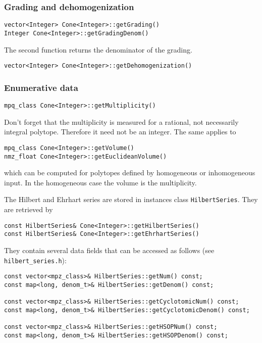 \documentclass[12pt,a4paper]{scrartcl}
\theoremstyle{definition}
\begin{document}
\begin{small}
\subsubsection{Grading and dehomogenization}

\begin{Verbatim}
vector<Integer> Cone<Integer>::getGrading()
Integer Cone<Integer>::getGradingDenom()
\end{Verbatim}
The second function returns the denominator of the grading.

\begin{Verbatim}
vector<Integer> Cone<Integer>::getDehomogenization()
\end{Verbatim}

\subsubsection{Enumerative data}

\begin{Verbatim}
mpq_class Cone<Integer>::getMultiplicity()
\end{Verbatim}
Don't forget that the multiplicity is measured for a rational, not necessarily integral polytope. Therefore it need not be an integer. The same applies to
\begin{Verbatim}
mpq_class Cone<Integer>::getVolume()
nmz_float Cone<Integer>::getEuclideanVolume()
\end{Verbatim}
which can be computed for polytopes defined by homogeneous or inhomogeneous input. In the homogeneous case the volume is the multiplicity.

The Hilbert and Ehrhart series are stored in instances class \verb|HilbertSeries|. They are retrieved by
\begin{Verbatim}
const HilbertSeries& Cone<Integer>::getHilbertSeries()
const HilbertSeries& Cone<Integer>::getEhrhartSeries()
\end{Verbatim}
They contain several data fields that can be accessed as follows (see \verb|hilbert_series.h|):
\begin{Verbatim}
const vector<mpz_class>& HilbertSeries::getNum() const;
const map<long, denom_t>& HilbertSeries::getDenom() const;

const vector<mpz_class>& HilbertSeries::getCyclotomicNum() const;
const map<long, denom_t>& HilbertSeries::getCyclotomicDenom() const;

const vector<mpz_class>& HilbertSeries::getHSOPNum() const;
const map<long, denom_t>& HilbertSeries::getHSOPDenom() const;


\end{Verbatim}
\end{small}
\end{document}
